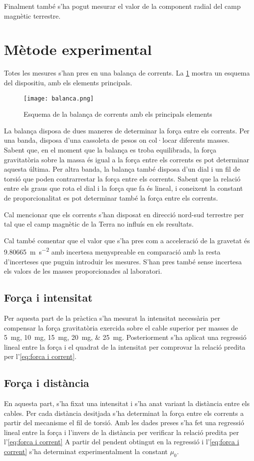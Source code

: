 Finalment també s'ha pogut mesurar el valor de la component radial del camp magnètic terrestre. 

\section{Mètode experimental}
Totes les mesures s'han pres en una balança de corrents. La \cref{fig:balanca} mostra un esquema del dispositiu, amb els elements principals.
\begin{figure}
	\centering
	\texttt{[image: balanca.png]}
	\caption{Esquema de la balança de corrents amb els principals elements}
	\label{fig:balanca}
\end{figure}

La balança disposa de dues maneres de determinar la força entre els corrents. Per una banda, disposa d'una cassoleta de pesos on col·locar diferents masses. Sabent que, en el moment que la balança es troba equilibrada, la força gravitatòria sobre la massa és igual a la força entre els corrents es pot determinar aquesta última. Per altra banda, la balança també disposa d'un dial i un fil de torsió que poden contrarrestar la força entre els corrents. Sabent que la relació entre els graus que rota el dial i la força que fa és lineal, i coneixent la constant de proporcionalitat es pot determinar també la força entre els corrents.

Cal mencionar que els corrents s'han disposat en direcció nord-sud terrestre per tal que el camp magnètic de la Terra no influís en els resultats.

Cal també comentar que el valor que s'ha pres com a acceleració de la gravetat és \SI{9.80665}{m.s^{-2}} amb incertesa menyspreable en comparació amb la resta d'incerteses que puguin introduir les mesures. S'han pres també sense incertesa els valors de les masses proporcionades al laboratori.

\subsection{Força i intensitat}
Per aquesta part de la pràctica s'ha mesurat la intensitat necessària per compensar la força gravitatòria exercida sobre el cable superior per masses de \SIlist{5; 10; 15; 20; 25}{mg}. Posteriorment s'ha aplicat una regressió lineal entre la força i el quadrat de la intensitat per comprovar la relació predita per l'\cref{eq:forca i corrent}.

\subsection{Força i distància}
En aquesta part, s'ha fixat una intensitat i s'ha anat variant la distància entre els cables. Per cada distància desitjada s'ha determinat la força entre els corrents a partir del mecanisme el fil de torsió. Amb les dades preses s'ha fet una regressió lineal entre la força i l'invers de la distància per verificar la relació predita per l'\cref{eq:forca i corrent} A partir del pendent obtingut en la regressió i l'\cref{eq:forca i corrent} s'ha determinat experimentalment la constant $\mu_0$.

